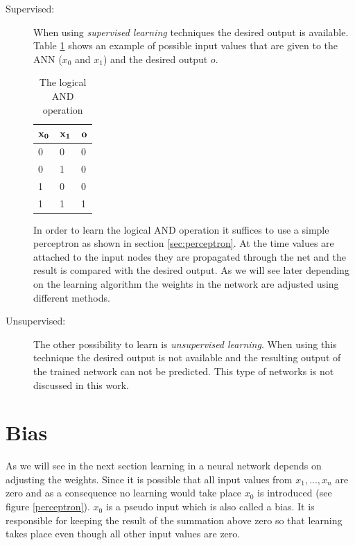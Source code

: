 \begin{description}
    \item[Supervised:]
		When using {\em supervised learning} techniques the desired output is
		available. Table \ref{logicaland} shows an example of possible input values that are given to the ANN ($x_0$ and $x_1$) and the desired output $o$.
		
		\begin{table}[htbp]
			\begin{center}
				\begin{tabular}{|l|l|l|}
				\hline
				$\bf{x_0}$&$\bf{x_1}$&$\bf{o}$\\
				\hline
				0&0&0\\
				\hline
				0&1&0\\
				\hline
				1&0&0\\
				\hline
				1&1&1\\
				\hline
				\end{tabular}
			\end{center}
			\vspace{-1em}
			\caption{The logical AND operation}
			\label{logicaland}
		\end{table}

		In order to learn the logical AND operation it suffices to use a simple perceptron as shown in section \ref{sec:perceptron}.
		At the time values are attached to the input nodes they are propagated
		through the net and the result is compared with the desired output.
		As we will see later depending on the learning
		algorithm the weights in the network are adjusted using different
		methods.

	\item[Unsupervised:]
		The other possibility to learn is {\em unsupervised learning}. When 
		using this technique the desired output is not available and the resulting output of the trained network can not be predicted. This type of networks is not discussed in this work.

\end{description}


\section{Bias}
\label{sec:bias}

As we will see in the next section learning in a neural network depends on adjusting the weights. Since it is possible that all input values from $x_1,...,x_n$ are zero and as a consequence no learning would take place $x_0$ is introduced (see figure \ref{perceptron}). $x_0$ is a pseudo input which is also called a bias. It is responsible for keeping the result of the summation above zero so that learning takes place even though all other input values are zero.

